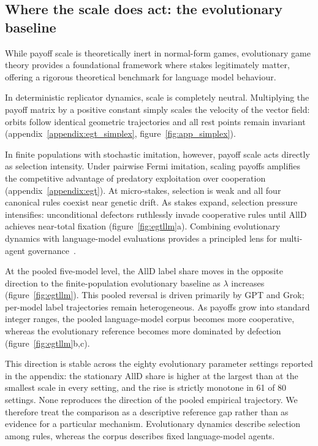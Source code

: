\documentclass[openacc]{rsproca_new}
\newcommand{\lam}{\lambda}
\begin{document}
\subsection{Where the scale does act: the evolutionary baseline}\label{sec:egt_pointer}

While payoff scale is theoretically inert in normal-form games, evolutionary
game theory provides a foundational framework where stakes legitimately
matter, offering a rigorous theoretical benchmark for language model behaviour.

In deterministic replicator dynamics, scale is completely neutral. Multiplying
the payoff matrix by a positive constant simply scales the velocity of the
vector field: orbits follow identical geometric trajectories and all rest points
remain invariant (appendix~\ref{appendix:egt_simplex}, figure~\ref{fig:app_simplex}).

In finite populations with stochastic imitation, however, payoff scale acts
directly as selection intensity. Under pairwise Fermi imitation, scaling payoffs
amplifies the competitive advantage of predatory exploitation over cooperation
(appendix~\ref{appendix:egt}). At micro-stakes, selection is weak and all four
canonical rules coexist near genetic drift. As stakes expand, selection pressure
intensifies: unconditional defectors ruthlessly invade cooperative rules until
AllD achieves near-total fixation (figure~\ref{fig:egtllm}a). Combining
evolutionary dynamics with language-model evaluations provides a principled
lens for multi-agent governance~\cite{balabanova2025media,buscemi2025llms}.

At the pooled five-model level, the AllD label share moves in the opposite
direction to the finite-population evolutionary baseline as $\lam$ increases
(figure~\ref{fig:egtllm}). This pooled reversal is driven primarily by GPT and
Grok; per-model label trajectories remain heterogeneous. As payoffs grow into
standard integer ranges, the pooled language-model corpus becomes more
cooperative, whereas the evolutionary reference becomes more dominated by
defection (figure~\ref{fig:egtllm}b,c).

This direction is stable across the eighty evolutionary parameter settings
reported in the appendix: the stationary AllD share is higher at the largest
than at the smallest scale in every setting, and the rise is strictly monotone
in 61 of 80 settings. None reproduces the direction of the pooled empirical
trajectory.
We therefore treat the comparison as a descriptive reference gap rather than as
evidence for a particular mechanism. Evolutionary dynamics describe selection
among rules, whereas the corpus describes fixed language-model agents.
\end{document}
